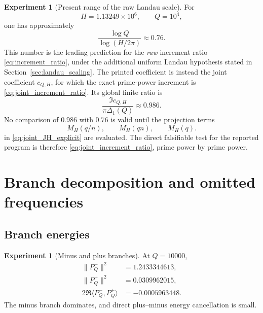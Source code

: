 \documentclass[11pt]{amsart}
\numberwithin{equation}{section}
\theoremstyle{plain}
\theoremstyle{definition}
\newtheorem{experiment}[theorem]{Experiment}
\theoremstyle{remark}
\newcommand{\1}{\mathbf{1}}
\begin{document}
\begin{experiment}[Present range of the raw Landau scale]
\label{exp:numerical_landau_ratio}
For
\begin{equation}
H=1.13249\times10^6,
\qquad Q=10^4,
\label{eq:numerical_H_Q_pair}
\end{equation}
one has approximately
\begin{equation}
\frac{\log Q}{\log(H/2\pi)}\approx0.76.
\label{eq:numerical_log_ratio}
\end{equation}
This number is the leading prediction for the \emph{raw} increment ratio
\eqref{eq:increment_ratio}, under the additional uniform Landau
hypothesis stated in Section~\ref{sec:landau_scaling}.  The printed
coefficient is instead the joint coefficient \(c_{Q,H}\), for which the
exact prime-power increment is \eqref{eq:joint_increment_ratio}.  Its
global finite ratio is
\begin{equation}
\frac{\Im c_{Q,H}}{\pi\Delta_1(Q)}\approx0.986.
\label{eq:numerical_global_ratio_again}
\end{equation}
No comparison of \(0.986\) with \(0.76\) is valid until the projection
terms
\begin{equation}
M_H(q/n),\qquad M_H(qn),\qquad M_H(q).
\label{eq:numerical_projection_kernel_terms}
\end{equation}
in \eqref{eq:joint_JH_explicit} are evaluated.  The direct falsifiable
test for the reported program is therefore
\eqref{eq:joint_increment_ratio}, prime power by prime power.
\end{experiment}

\section{Branch decomposition and omitted frequencies}
\label{sec:numerical_branches_omitted}

\subsection{Branch energies}
\label{subsec:numerical_branch_energies}

\begin{experiment}[Minus and plus branches]
\label{exp:numerical_branch_energy_detailed}
At $Q=10000$,
\begin{align}
\|P_Q^-\|^2
&=1.2433344613,
\label{eq:numerical_minus_energy_detailed}
\\
\|P_Q^+\|^2
&=0.0309962015,
\label{eq:numerical_plus_energy_detailed}
\\
2\Re\langle P_Q^-,P_Q^+\rangle
&=-0.0005963448.
\label{eq:numerical_cross_energy_detailed}
\end{align}
The minus branch dominates, and direct plus--minus energy cancellation is
small.
\end{experiment}
\end{document}
